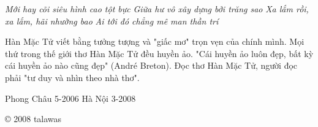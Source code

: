 \documentclass[../main.tex]{subfiles}
\begin{document}
\begin{multicols}{2}
\textit{Mới hay cõi siêu hình cao tột bực } 
\textit{Giữa hư vô xây dựng  bởi trăng sao} 
\textit{Xa lắm rồi, xa lắm, hãi nhường bao} 
\textit{Ai tới đó chẳng  mê man thần trí} 
 
Hàn Mặc Tử viết bằng tưởng tượng và "giấc mơ" trọn vẹn của chính mình. Mọi thứ trong thế giới thơ Hàn Mặc Tử đều huyền ảo. "Cái huyền ảo luôn đẹp, bất kỳ cái huyền ảo nào cũng đẹp" (André Breton). Đọc thơ Hàn Mặc Tử, người đọc phải "tư duy và nhìn theo nhà thơ".  
 
Phong Châu 5-2006 
Hà Nội 3-2008 
 
© 2008 talawas 




\end{multicols}
\end{document}
